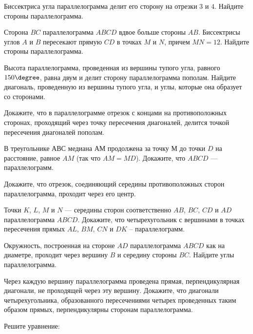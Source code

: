 %
%
\begin{class}[number=6]
	\begin{listofex}
			\item Биссектриса угла параллелограмма делит его сторону на отрезки \( 3 \) и \( 4 \).
			Найдите стороны параллелограмма.
			\item Сторона \( BC \) параллелограмма \( ABCD \) вдвое больше стороны \( AB \).
			Биссектрисы углов \( A \) и \( B \) пересекают прямую \( CD \) в точках \( M \) и \( N \), причем \( MN=12 \).
			Найдите стороны параллелограмма.
			\item Высота параллелограмма, проведенная из вершины тупого угла,
			равного \( 150\degree \), равна двум и делит сторону
			параллелограмма пополам. Найдите диагональ,
			проведенную из вершины тупого угла, и углы,
			которые она образует со сторонами.
		
		\item Докажите, что в параллелограмме отрезок с концами на противоположных сторонах, проходящий через точку пересечения диагоналей, делится точкой пересечения диагоналей пополам.
		\item В треугольнике \( АВС \) медиана \( АМ \) продолжена за точку \( М \) до точки \( D \) на расстояние, равное \( AM \) (так что \( AM=MD\)). Докажите, что \( ABCD \) --- параллелограмм.
		\item Докажите, что отрезок, соединяющий середины противоположных сторон параллелограмма, проходит через его центр.
		\item Точки \( K \), \( L \), \( M \) и \( N \) --- середины сторон соответственно \( AB \), \( BC \), \( CD \) и \( AD \) параллелограмма \( ABCD \). Докажите, что четырехугольник с вершинами в точках пересечения прямых \( AL \), \( BM \), \( CN \) и \( DK \) -- параллелограмм.
		\item Окружность, построенная на стороне \( AD \) параллелограмма \( ABCD \) как на диаметре, проходит через вершину \( B \) и середину стороны \( BC \). Найдите углы параллелограмма.
		\item Через каждую вершину параллелограмма проведена прямая, перпендикулярная диагонали, не проходящей через эту вершину. Докажите, что диагонали четырехугольника, образованного пересечениями четырех проведенных таким образом прямых, перпендикулярны сторонам параллелограмма.
		\item Решите уравнение:
		\begin{itasks}[2]
			\task {}
			\task {}
			\task {}
			\task {}
		\end{itasks}
	\end{listofex}
\end{class}
